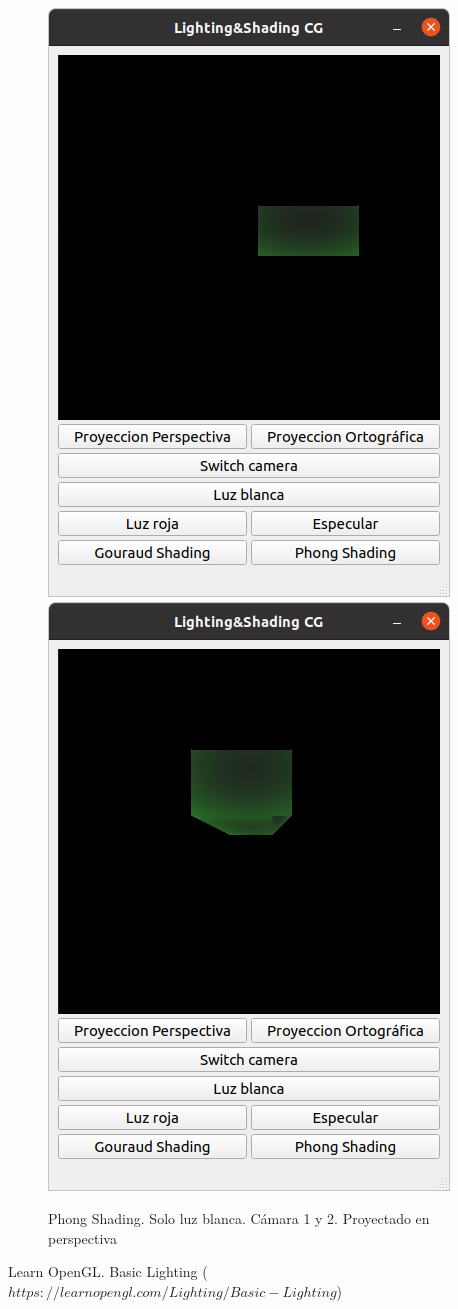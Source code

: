 \documentclass[12pt]{article}
\begin{document}
\begin{figure}[H]
\centering
\includegraphics[scale=0.5]{images/ej5.png}
\includegraphics[scale=0.5]{images/ej6.png}
\caption{Phong Shading. Solo luz blanca. Cámara 1 y 2. Proyectado en perspectiva}
\end{figure}


\begin{thebibliography}{99}


 Learn OpenGL. Basic Lighting ($https://learnopengl.com/Lighting/Basic-Lighting$)

\end{thebibliography}
\end{document}
